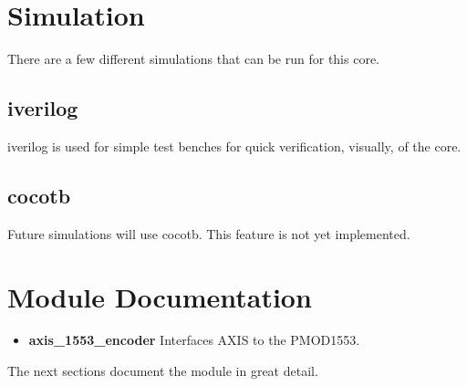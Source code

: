 \newpage

\section{Simulation}
\par
There are a few different simulations that can be run for this core.

\subsection{iverilog}
\par
iverilog is used for simple test benches for quick verification, visually, of the core.

\subsection{cocotb}
\par
Future simulations will use cocotb. This feature is not yet implemented.

\newpage

\section{Module Documentation} \label{Module Documentation}

\begin{itemize}
\item \textbf{axis\_1553\_encoder} Interfaces AXIS to the PMOD1553.\\
\end{itemize}
The next sections document the module in great detail.

